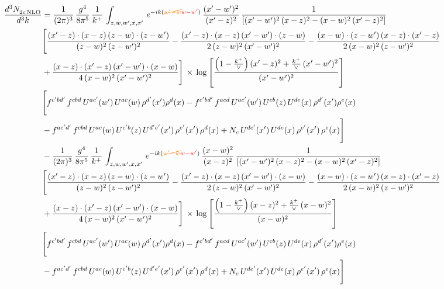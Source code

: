 \documentclass[9pt]{article}
\numberwithin{equation}{section}
\begin{document}
\begin{align}
    \frac{d^{3}N_{2c\,\rm NLO}^{\rm}}{d^{3}k}  & =  \frac{1}{(2\pi)^{3}}\, \frac{g^{4}}{8\pi^{5}}\,\frac{1}{k^{+}}\,\int_{z,w,w^{\prime},x,x'}\, e^{-ik({\color{orange}\cancel{w^{\prime}-w}}{\color{red}w-w^{\prime}})}\,\frac{(x'-w')^{2}}{(x'-z)^{2}}\, \frac{1}{\left[(x'-w')^{2}\, (x-z)^{2} - (x-w)^{2}\, (x'-z)^{2}\right]} \notag \\ & \Bigg[\frac{(x'-z)\cdot (x-z)\, (z-w)\cdot (z-w')}{(z-w)^{2}\, (z-w')^{2}}-\frac{(x'-z)\cdot (x-z)\, (x'-w')\cdot (z-w)}{2\, (z-w)^{2}\, (x'-w')^{2}} -\frac{(x-w)\cdot (z-w')\, (x-z)\cdot (x'-z)}{2\, (x-w)^{2}\, (z-w')^{2}}\notag \\ & +\frac{(x-z)\cdot (x'-z)\, (x'-w')\cdot (x-w)}{4\, (x-w)^{2}\, (x'-w')^{2}}\Bigg]\,\times\, \log{\left[\frac{\left(1-\frac{k^{+}}{\vee}\right)(x'-z)^{2}+\frac{k^{+}}{\vee}\,(x'-w')^{2}}{(x'-w')^{2}}\right]} \notag \\ &  \Bigg[f^{c'bd'}\,f^{cbd}\, U^{ac'}(w')\,U^{ac}(w)\,\rho^{d'}(x')\rho^{d}(x)- f^{c'bd'}\,f^{acd}\,U^{ac'}(w')\,U^{cb}(z)\,U^{de}(x)\,\rho^{d'}(x')\rho^{e}(x) \notag \\ & -f^{ac'd'}\,f^{cbd}\,U^{ac}(w)\,U^{c'b}(z)\,U^{d'e'}(x')\,\rho^{e'}(x')\,\rho^{d}(x) +N_{c}\,U^{de'}(x')\,U^{de}(x)\,\rho^{e'}(x')\,\rho^{e}(x)\Bigg] \notag \\
& -\frac{1}{(2\pi)^{3}}\, \frac{g^{4}}{8\pi^{5}}\,\frac{1}{k^{+}}\,\int_{z,w,w^{\prime},x,x'}\, e^{-ik({\color{orange}\cancel{w^{\prime}-w}}{\color{red}w-w^{\prime}})}\,\frac{(x-w)^{2}}{(x-z)^{2}}\, \frac{1}{\left[(x'-w')^{2}\, (x-z)^{2} - (x-w)^{2}\, (x'-z)^{2}\right]} \notag \\ & \Bigg[\frac{(x'-z)\cdot (x-z)\, (z-w)\cdot (z-w')}{(z-w)^{2}\, (z-w')^{2}}-\frac{(x'-z)\cdot (x-z)\, (x'-w')\cdot (z-w)}{2\, (z-w)^{2}\, (x'-w')^{2}} -\frac{(x-w)\cdot (z-w')\, (x-z)\cdot (x'-z)}{2\, (x-w)^{2}\, (z-w')^{2}}\notag \\ & +\frac{(x-z)\cdot (x'-z)\, (x'-w')\cdot (x-w)}{4\, (x-w)^{2}\, (x'-w')^{2}}\Bigg]\,\times\, \log{\left[\frac{\left(1-\frac{k^{+}}{\vee}\right)(x-z)^{2}+\frac{k^{+}}{\vee}\,(x-w)^{2}}{(x-w)^{2}}\right]} \notag \\ &  \Bigg[f^{c'bd'}\,f^{cbd}\, U^{ac'}(w')\,U^{ac}(w)\,\rho^{d'}(x')\rho^{d}(x)- f^{c'bd'}\,f^{acd}\,U^{ac'}(w')\,U^{cb}(z)\,U^{de}(x)\,\rho^{d'}(x')\rho^{e}(x) \notag \\ & -f^{ac'd'}\,f^{cbd}\,U^{ac}(w)\,U^{c'b}(z)\,U^{d'e'}(x')\,\rho^{e'}(x')\,\rho^{d}(x) +N_{c}\,U^{de'}(x')\,U^{de}(x)\,\rho^{e'}(x')\,\rho^{e}(x)\Bigg]
\end{align}
\end{document}
